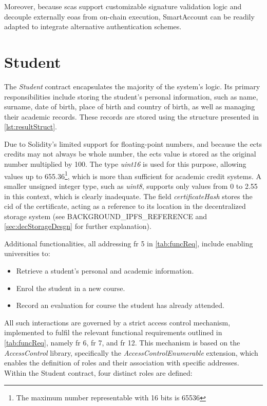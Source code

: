 Moreover, because \acrlong{sca}s support customizable signature validation logic and decouple externally \acrshort{eoa}s from on-chain execution, SmartAccount can be readily adapted to integrate alternative authentication schemes.

\section{Student}
\label{sec:studentContract}
The \textit{Student} contract encapsulates the majority of the system's logic. Its primary responsibilities include storing the student's personal information, such as name, surname, date of birth, place of birth and country of birth, as well as managing their academic records. These records are stored using the structure presented in \cref{lst:resultStruct}. 

Due to Solidity's limited support for floating-point numbers, and because the \acrshort{ects} credits may not always be whole number, the \acrshort{ects} value is stored as the original number multiplied by 100. The type \textit{uint16} is used for this purpose, allowing values up to 655.36\footnote{The maximum number representable with 16 bits is 65536},  which is more than sufficient for academic credit systems. A smaller unsigned integer type, such as \textit{uint8}, supports only values from 0 to 2.55 in this context, which is clearly inadequate. The field \textit{certificateHash} stores the \acrfull{cid} of the certificate, acting as a reference to its location in the decentralized storage system (see BACKGROUND\_IPFS\_REFERENCE and \cref{sec:decStorageDesgn} for further explanation). 

Additional functionalities, all addressing \acrshort{fr} 5 in \cref{tab:funcReq}, include enabling universities to:
\begin{itemize}
    \item Retrieve a student's personal and academic information.
    \item Enrol the student in a new course.
    \item Record an evaluation for course the student has already attended.
\end{itemize}
All such interactions are governed by a strict access control mechanism, implemented to fulfil the relevant functional requirements outlined in \cref{tab:funcReq}, namely \acrshort{fr} 6, \acrshort{fr} 7, and \acrshort{fr} 12. This mechanism is based on the \textit{AccessControl} library, specifically the \textit{AccessControlEnumerable} extension, which enables the definition of roles and their association with specific addresses. Within the Student contract, four distinct roles are defined:

